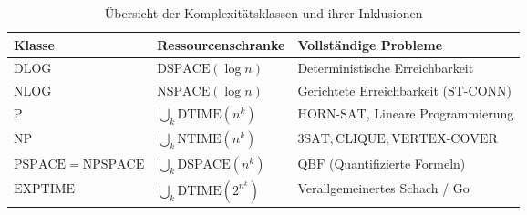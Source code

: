 \begin{table}[htbp]
    \centering
    \small
    \caption{Übersicht der Komplexitätsklassen und ihrer Inklusionen}
    \label{tab:komplexitaet}
    \vspace{0.5em}
    \begin{tabular}{p{4.2cm}p{4cm}p{5.5cm}}
        \toprule
        \textbf{Klasse} & \textbf{Ressourcenschranke} & \textbf{Vollständige Probleme} \\
        \midrule
        $\mathrm{DLOG}$ & $\mathrm{DSPACE}(\log n)$ & Deterministische Erreichbarkeit \\
        $\mathrm{NLOG}$ & $\mathrm{NSPACE}(\log n)$ & Gerichtete Erreichbarkeit ($\mathrm{ST\text{-}CONN}$) \\
        $\mathrm{P}$ & $\bigcup_k \mathrm{DTIME}(n^k)$ & $\mathrm{HORN\text{-}SAT}$, Lineare Programmierung \\
        $\mathrm{NP}$ & $\bigcup_k \mathrm{NTIME}(n^k)$ & $\mathrm{3SAT}, \mathrm{CLIQUE}, \mathrm{VERTEX\text{-}COVER}$ \\
        $\mathrm{PSPACE} = \mathrm{NPSPACE}$ & $\bigcup_k \mathrm{DSPACE}(n^k)$ & $\mathrm{QBF}$ (Quantifizierte Formeln) \\
        $\mathrm{EXPTIME}$ & $\bigcup_k \mathrm{DTIME}(2^{n^k})$ & Verallgemeinertes Schach / Go \\
        \bottomrule
    \end{tabular}
\end{table}
